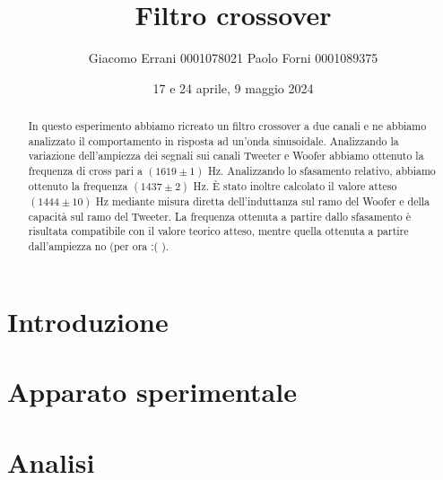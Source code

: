 \documentclass[12pt,a4paper]{article}
\title{Filtro crossover} %
\date{17 e 24 aprile, 9 maggio 2024}
\author{Giacomo Errani 0001078021 Paolo Forni 0001089375}
\begin{document}

\newcommand{\numberthis}{\addtocounter{equation}{1}\tag{\theequatio}}

\newcommand{\theoryF}{ $(1444 \pm 10)$ Hz}
\newcommand{\amplitudeF}{$(1619 \pm 1)$ Hz}
\newcommand{\phaseF}{$(1437 \pm 2)$ Hz}

\maketitle

\begin{abstract}

  In questo esperimento abbiamo ricreato un filtro crossover a due canali e ne abbiamo analizzato il comportamento
  in risposta ad un'onda sinusoidale. Analizzando la variazione dell'ampiezza dei segnali sui canali Tweeter e Woofer
  abbiamo ottenuto la frequenza di cross pari a \amplitudeF. Analizzando lo sfasamento relativo, abbiamo ottenuto la
  frequenza \phaseF. È stato inoltre calcolato il valore atteso \theoryF \hspace{1pt}
  mediante misura diretta dell'induttanza sul ramo del Woofer e della capacità sul ramo del Tweeter.
  La frequenza ottenuta a partire dallo sfasamento è risultata compatibile con il valore teorico atteso, mentre quella
  ottenuta a partire dall'ampiezza no (per ora :( ).

\end{abstract}


\section{Introduzione}\label{sec:introduzione}

  


\section{Apparato sperimentale}\label{sec:apparato-sperimentale}

  


\section{Analisi}\label{sec:analisi}

  
\end{document}
